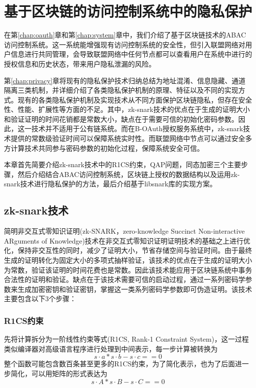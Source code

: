 
\chapter{基于区块链的访问控制系统中的隐私保护}

在第\ref{chap:oauth}章和第\ref{chap:system}章中，我们介绍了基于区块链技术的ABAC访问控制系统。这一系统能增强现有访问控制系统的安全性，但引入联盟网络对用户信息进行共同管理，会导致联盟网络中任何节点都可以查看用户在系统中进行的授权信息和历史状态，带来用户隐私泄漏的风险。

第\ref{chap:privacy}章将现有的隐私保护技术归纳总结为地址混淆、信息隐藏、通道隔离三类机制，并详细介绍了各类隐私保护机制的原理、特征以及不同的实现方式。现有的各类隐私保护机制及实现技术从不同方面保护区块链隐私，但存在安全性、性能、扩展性等方面的不足。其中，zk-snark技术的优点在于生成的证明大小和验证证明的时间花销都是常数大小，缺点在于需要可信的初始化密码参数。因此，这一技术并不适用于公有链系统。而在B-OAuth授权服务系统中，zk-snark技术提供的常数级验证时间可以保障系统实时性。而联盟网络中节点可以通过安全多方计算技术共同参与密码参数的初始化过程，保障系统安全可信。

本章首先简要介绍zk-snark技术中的R1CS约束，QAP问题，同态加密三个主要步骤，然后介绍结合ABAC访问控制系统，区块链上授权的数据结构以及运用zk-snark技术进行隐私保护的方法，最后介绍基于libsnark库的实现方案。

\section{zk-snark技术}
\label{sec:zk-snark}

简明非交互式零知识证明(zk-SNARK，zero-knowledge Succinct Non-interactive ARguments of Knowledge)技术在非交互式零知识证明证明技术的基础之上进行优化，保持非交互性的同时，减少了证明大小，节省存储空间与验证时间。由于最终生成的证明转化为固定大小的多项式抽样验证，该技术的优点在于生成的证明大小为常数，验证该证明的时间花费也是常数。因此该技术能应用于区块链系统中事务合法性的证明和验证。缺点在于该技术需要可信的启动过程，通过一系列密码学参数来生成加密密钥和验证密钥，掌握这一类系列密码学参数即可伪造证明。该技术主要包含以下3个步骤：

\subsection{R1CS约束}

先将计算拆分为一阶线性约束等式(R1CS, Rank-1 Constraint System)，这一过程类似编译器对高级语言程序进行处理到中间表示，每一步计算被转换为
$$s \cdot a * s \cdot b - s \cdot c == 0$$整个函数可能包含数百条甚至更多的R1CS约束，为了简化表示，也为了后面进一步简化，可以用矩阵的形式表达为
$$s \cdot A * s \cdot B - s \cdot C == 0$$

